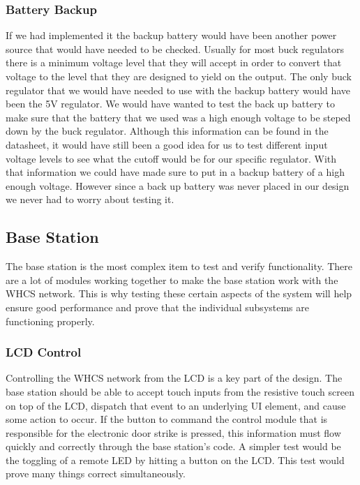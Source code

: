 \subsubsection{Battery Backup}
If we had implemented it the backup battery would have been another power source that would have needed to be checked.
Usually for most buck regulators there is a minimum voltage level that they
will accept in order to convert that voltage to the level that they are
designed to yield on the output. The only buck regulator that we would have needed to
use with the backup battery would have been the 5V regulator. We would have wanted to test the back up battery to make sure that the battery that we used was a high enough voltage to be steped down by the buck regulator. Although this information can be found in the datasheet, it would have still been a good idea for us to test different input voltage levels to
see what the cutoff would be for our specific regulator. With that information
we could have made sure to put in a backup battery of a high enough voltage. However since a back up battery was never placed in our design we never had to worry about testing it.

\subsection{Base Station}
The base station is the most complex item to test and verify functionality.
There are a lot of modules working together to make the base station work with
the WHCS network. This is why testing these certain aspects of the system will
help ensure good performance and prove that the individual subsystems are
functioning properly.

\subsubsection{LCD Control}
Controlling the WHCS network from the LCD is a key part of the design. The base
station should be able to accept touch inputs from the resistive touch screen
on top of the LCD, dispatch that event to an underlying UI element, and cause
some action to occur. If the button to command the control module that is
responsible for the electronic door strike is pressed, this information must
flow quickly and correctly through the base station's code. A simpler test
would be the toggling of a remote LED by hitting a button on the LCD. This test
would prove many things correct simultaneously.

